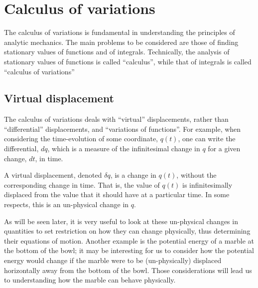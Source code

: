 %
\chapter{Calculus of variations}
\label{chap:CalculusVariation}
The calculus of variations is fundamental in understanding the principles of analytic mechanics. The main problems to be considered are those of finding stationary values of functions and of integrals. Technically, the analysis of stationary values of functions is called ``calculus'', while that of integrals is called ``calculus of variations''

\section{Virtual displacement}
The calculus of variations deals with ``virtual'' displacements, rather than ``differential'' displacements, and ``variations of functions''. For example, when considering the time-evolution of some coordinate, $q(t)$, one can  write the differential, $dq$, which is a measure of the infinitesimal change in $q$ for a given change, $dt$, in time. 

A virtual displacement, denoted $\delta q$, is a change in $q(t)$, without the corresponding change in time. That is, the value of $q(t)$ is infinitesimally displaced from the value that it should have at a particular time. In some respects, this is an un-physical change in $q$.

As will be seen later, it is very useful to look at these un-physical changes in quantities to set restriction on how they can change physically, thus determining their equations of motion. Another example is the potential energy of a marble at the bottom of the bowl; it may be interesting for us to consider how the potential energy would change if the marble were to be (un-physically) displaced horizontally away from the bottom of the bowl. Those considerations will lead us to understanding how the marble can behave physically.

